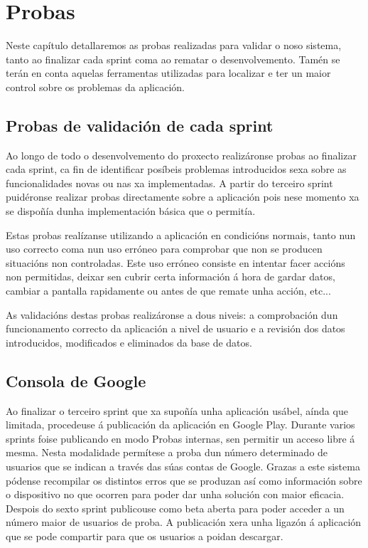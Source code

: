 \chapter{Probas}

Neste capítulo detallaremos as probas realizadas para validar o noso sistema, tanto ao finalizar cada sprint coma ao rematar o desenvolvemento. Tamén se terán en conta aquelas ferramentas utilizadas para localizar e ter un maior control sobre os problemas da aplicación.



\section{Probas de validación de cada sprint}
Ao longo de todo o desenvolvemento do proxecto realizáronse probas ao finalizar cada sprint, ca fin de identificar posíbeis problemas introducidos sexa sobre as funcionalidades novas ou nas xa implementadas. A partir do terceiro sprint puidéronse realizar probas directamente sobre a aplicación pois nese momento xa se dispoñía dunha implementación básica que o permitía.

Estas probas realízanse utilizando a aplicación en condicións normais, tanto nun uso correcto coma nun uso erróneo para comprobar que non se producen situacións non controladas. Este uso erróneo consiste en intentar facer accións non permitidas, deixar sen cubrir certa información á hora de gardar datos, cambiar a pantalla rapidamente ou antes de que remate unha acción, etc...

As validacións destas probas realizáronse a dous niveis: a comprobación dun funcionamento correcto da aplicación a nivel de usuario e a revisión dos datos introducidos, modificados e eliminados da base de datos.


\section{Consola de Google}
Ao finalizar o terceiro sprint que xa supoñía unha aplicación usábel, aínda que limitada, procedeuse á publicación da aplicación en Google Play. Durante varios sprints foise publicando en modo Probas internas, sen permitir un acceso libre á mesma. Nesta modalidade permítese a proba dun número determinado de usuarios que se indican a través das súas contas de Google. Grazas a este sistema pódense recompilar os distintos erros que se produzan así como información sobre o dispositivo no que ocorren para poder dar unha solución con maior eficacia.
Despois do sexto sprint publicouse como beta aberta para poder acceder a un número maior de usuarios de proba. A publicación xera unha ligazón á aplicación que se pode compartir para que os usuarios a poidan descargar.


